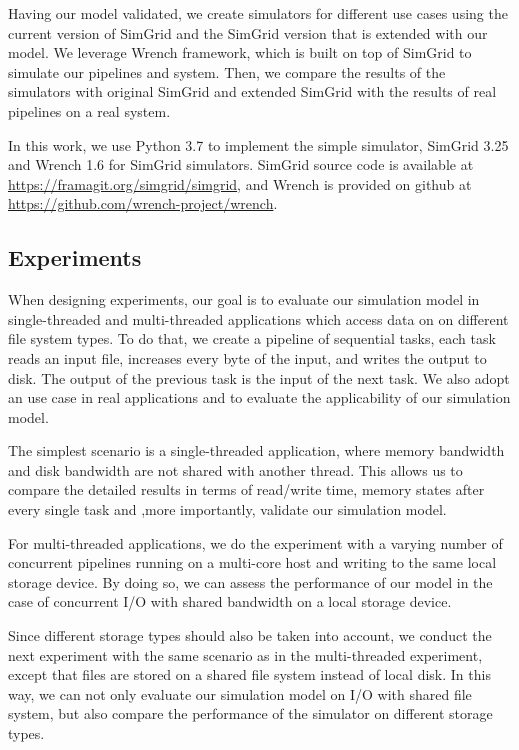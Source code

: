 \documentclass[conference]{IEEEtran}
\begin{document}
			Having our model validated, we create simulators for different use cases 
			using the current version of SimGrid and the SimGrid version that is 
			extended with our model. We leverage Wrench framework, which is 
			built on top of SimGrid to simulate our pipelines and system.
			Then, we compare the results of the simulators with
			original SimGrid and extended SimGrid with the results of real
			pipelines on a real system. 
		
			In this work, we use Python 3.7 to implement the simple
			simulator, SimGrid 3.25 and Wrench 1.6 for SimGrid simulators. 
			SimGrid source code is available at 
			\url{https://framagit.org/simgrid/simgrid}, and Wrench is provided on
			github at \url{https://github.com/wrench-project/wrench}.
			
		\subsection{Experiments}
		
			When designing experiments, our goal is to evaluate our simulation model 
			in single-threaded and multi-threaded applications which access data on 
			on different file system types. 
			To do that, we create a pipeline of sequential tasks, each task 
			reads an input file, increases every byte of the input, and writes the 
			output to disk. The output of the previous task is the input of 
			the next task. We also adopt an use case in real applications and 
			to evaluate the applicability of our simulation model.
			
			The simplest scenario is a single-threaded application, where memory 
			bandwidth and disk bandwidth are not shared with another thread. 
			This allows us to compare the detailed results in terms of read/write time, 
			memory states after every single task and ,more importantly, validate our 
			simulation model. 
			
			For multi-threaded applications, we do the experiment with a varying 
			number of concurrent pipelines running on a multi-core host 
			and writing to the same local storage device. 
		    By doing so, we can assess the performance of our model in the case  
		    of concurrent I/O with shared bandwidth on a local storage device.
		    
		    Since different storage types should also be taken into account, 
		    we conduct the next experiment with the same scenario as 
		    in the multi-threaded experiment, except that files are stored on a 
		    shared file system instead of local disk. 
		    In this way, we can not only evaluate our simulation model on I/O 
		    with shared file system, but also compare the 
		    performance of the simulator on different storage types. 
		    
\end{document}
